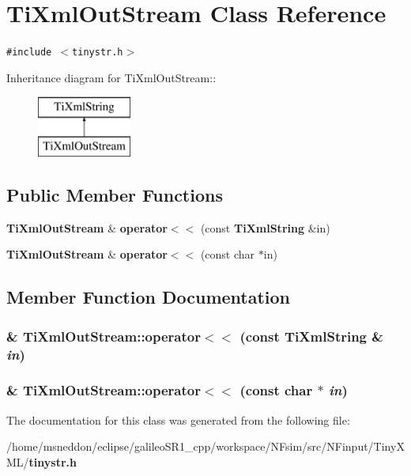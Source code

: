 \section{TiXmlOutStream Class Reference}
\label{classTiXmlOutStream}
{\tt \#include $<$tinystr.h$>$}

Inheritance diagram for TiXmlOutStream::\begin{figure}[H]
\begin{center}
\leavevmode
\includegraphics[height=2cm]{classTiXmlOutStream}
\end{center}
\end{figure}
\subsection*{Public Member Functions}
\begin{CompactItemize}
\item 
{\bf TiXmlOutStream} \& {\bf operator$<$$<$} (const {\bf TiXmlString} \&in)
\item 
{\bf TiXmlOutStream} \& {\bf operator$<$$<$} (const char $\ast$in)
\end{CompactItemize}


\subsection{Member Function Documentation}
\subsubsection{\& TiXmlOutStream::operator$<$$<$ (const {\bf TiXmlString} \& {\em in})\hspace{0.3cm}{\tt  [inline]}}\label{classTiXmlOutStream_3640dcb1c0903be3bc6966cdc9a79db6}


\subsubsection{\& TiXmlOutStream::operator$<$$<$ (const char $\ast$ {\em in})\hspace{0.3cm}{\tt  [inline]}}\label{classTiXmlOutStream_f2117e5a8cbfcb69544804ad2859bfb6}




The documentation for this class was generated from the following file:\begin{CompactItemize}
\item 
/home/msneddon/eclipse/galileoSR1\_\-cpp/workspace/NFsim/src/NFinput/TinyXML/{\bf tinystr.h}\end{CompactItemize}
